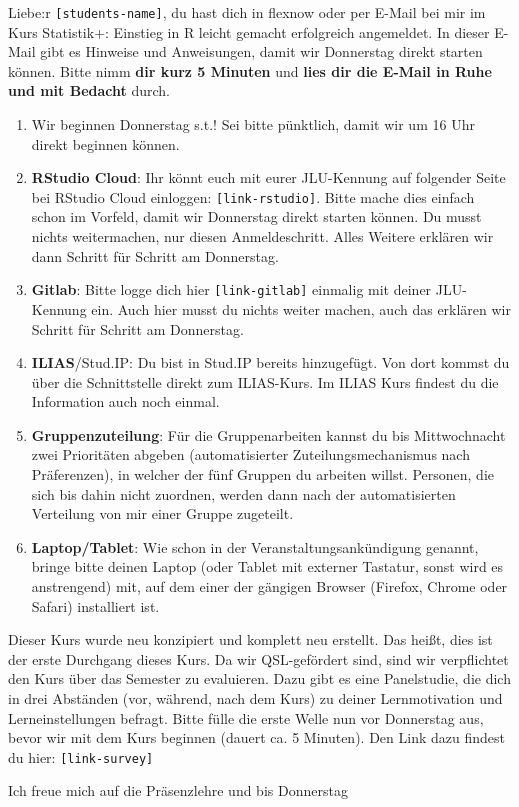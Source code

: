 Liebe:r \texttt{[students-name]},
du hast dich in flexnow oder per E-Mail bei mir im Kurs Statistik+: Einstieg in R leicht gemacht erfolgreich angemeldet. In dieser E-Mail gibt es Hinweise und Anweisungen, damit wir Donnerstag direkt starten können. Bitte nimm \textbf{dir kurz 5 Minuten} und \textbf{lies dir die E-Mail in Ruhe und mit Bedacht} durch.

\begin{enumerate}
	\item Wir beginnen Donnerstag s.t.! Sei bitte pünktlich, damit wir um 16 Uhr direkt beginnen können.
	\item \textbf{RStudio Cloud}: Ihr könnt euch mit eurer JLU-Kennung auf folgender Seite bei RStudio Cloud einloggen: \texttt{[link-rstudio]}. Bitte mache dies einfach schon im Vorfeld, damit wir Donnerstag direkt starten können. Du musst nichts weitermachen, nur diesen Anmeldeschritt. Alles Weitere erklären wir dann Schritt für Schritt am Donnerstag.
    \item \textbf{Gitlab}: Bitte logge dich hier \texttt{[link-gitlab]} einmalig mit deiner JLU-Kennung ein. Auch hier musst du nichts weiter machen, auch das erklären wir Schritt für Schritt am Donnerstag.
	\item \textbf{ILIAS}/Stud.IP: Du bist in Stud.IP bereits hinzugefügt. Von dort kommst du über die Schnittstelle direkt zum ILIAS-Kurs. Im ILIAS Kurs findest du die Information auch noch einmal. 
    \item \textbf{Gruppenzuteilung}: Für die Gruppenarbeiten kannst du bis Mittwochnacht zwei Prioritäten abgeben (automatisierter Zuteilungsmechanismus nach Präferenzen), in welcher der fünf Gruppen du arbeiten willst. Personen, die sich bis dahin nicht zuordnen, werden dann nach der automatisierten Verteilung von mir einer Gruppe zugeteilt.
    \item \textbf{Laptop/Tablet}: Wie schon in der Veranstaltungsankündigung genannt, bringe bitte deinen Laptop (oder Tablet mit externer Tastatur, sonst wird es anstrengend) mit, auf dem einer der gängigen Browser (Firefox, Chrome oder Safari) installiert ist. 
\end{enumerate}

Dieser Kurs wurde neu konzipiert und komplett neu erstellt. Das heißt, dies ist der erste Durchgang dieses Kurs. Da wir QSL-gefördert sind, sind wir verpflichtet den Kurs über das Semester zu evaluieren. Dazu gibt es eine Panelstudie, die dich in drei Abständen (vor, während, nach dem Kurs) zu deiner Lernmotivation und Lerneinstellungen befragt. Bitte fülle die erste Welle nun vor Donnerstag aus, bevor wir mit dem Kurs beginnen (dauert ca. 5 Minuten). Den Link dazu findest du hier: \texttt{[link-survey]}

Ich freue mich auf die Präsenzlehre und bis Donnerstag